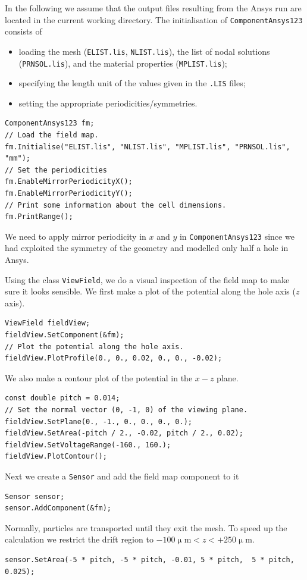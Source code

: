 In the following we assume that the output files resulting from the 
Ansys run are located in the current working directory.
The initialisation of \texttt{ComponentAnsys123} consists of 
\begin{itemize}
  \item
  loading the mesh (\texttt{ELIST.lis}, \texttt{NLIST.lis}), 
  the list of nodal solutions (\texttt{PRNSOL.lis}), and the 
  material properties (\texttt{MPLIST.lis});
  \item
  specifying the length unit of the values given in the 
  \texttt{.LIS} files;
  \item
  setting the appropriate periodicities/symmetries.
\end{itemize}
\begin{lstlisting}
ComponentAnsys123 fm;
// Load the field map.
fm.Initialise("ELIST.lis", "NLIST.lis", "MPLIST.lis", "PRNSOL.lis", "mm");
// Set the periodicities
fm.EnableMirrorPeriodicityX();
fm.EnableMirrorPeriodicityY();
// Print some information about the cell dimensions.
fm.PrintRange();
\end{lstlisting}
We need to apply mirror periodicity in $x$ and $y$
in \texttt{ComponentAnsys123} since we had exploited the symmetry 
of the geometry and modelled only half a hole in Ansys.

Using the class \texttt{ViewField}, we do a visual inspection of the 
field map to make sure it looks sensible.
We first make a plot of the potential along the hole axis ($z$ axis).
\begin{lstlisting}
ViewField fieldView;
fieldView.SetComponent(&fm);
// Plot the potential along the hole axis.
fieldView.PlotProfile(0., 0., 0.02, 0., 0., -0.02);
\end{lstlisting}
We also make a contour plot of the potential in the $x - z$ plane.
\begin{lstlisting}
const double pitch = 0.014;
// Set the normal vector (0, -1, 0) of the viewing plane.
fieldView.SetPlane(0., -1., 0., 0., 0., 0.);
fieldView.SetArea(-pitch / 2., -0.02, pitch / 2., 0.02);
fieldView.SetVoltageRange(-160., 160.);
fieldView.PlotContour();
\end{lstlisting}
Next we create a \texttt{Sensor} and add the field map 
component to it
\begin{lstlisting}
Sensor sensor;
sensor.AddComponent(&fm);
\end{lstlisting}
Normally, particles are transported until they exit the mesh. 
To speed up the calculation we restrict the drift region to 
$-100\upmu\text{m} < z < +250\upmu\text{m}$.
\begin{lstlisting}
sensor.SetArea(-5 * pitch, -5 * pitch, -0.01, 5 * pitch,  5 * pitch,  0.025);
\end{lstlisting}
